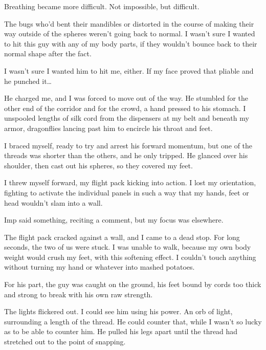 Breathing became more difficult.  Not impossible, but difficult.



The bugs who'd bent their mandibles or distorted in the course of making their way outside of the spheres weren't going back to normal.  I wasn't sure I wanted to hit this guy with any of my body parts, if they wouldn't bounce back to their normal shape after the fact.



I wasn't sure I wanted him to hit me, either.  If my face proved that pliable and he punched it\ldots



He charged me, and I was forced to move out of the way.  He stumbled for the other end of the corridor and for the crowd, a hand pressed to his stomach.  I unspooled lengths of silk cord from the dispensers at my belt and beneath my armor, dragonflies lancing past him to encircle his throat and feet.



I braced myself, ready to try and arrest his forward momentum, but one of the threads was shorter than the others, and he only tripped.  He glanced over his shoulder, then cast out his spheres, so they covered my feet.



I threw myself forward, my flight pack kicking into action.  I lost my orientation, fighting to activate the individual panels in such a way that my hands, feet or head wouldn't slam into a wall.



Imp said something, reciting a comment, but my focus was elsewhere.



The flight pack cracked against a wall, and I came to a dead stop.  For long seconds, the two of us were stuck.  I was unable to walk, because my own body weight would crush my feet, with this softening effect.  I couldn't touch anything without turning my hand or whatever into mashed potatoes.



For his part, the guy was caught on the ground, his feet bound by cords too thick and strong to break with his own raw strength.



The lights flickered  out.  I could see him using his power.  An orb of light, surrounding a length of the thread.  He could counter that, while I wasn't so lucky as to be able to counter him.  He pulled his legs apart until the thread had stretched out to the point of snapping.



